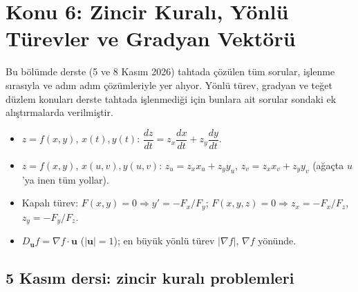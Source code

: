 \section{Konu 6: Zincir Kuralı, Yönlü Türevler ve Gradyan Vektörü}

Bu bölümde derste (5 ve 8 Kasım 2026) tahtada çözülen tüm sorular, işlenme sırasıyla ve adım adım çözümleriyle yer alıyor.
Yönlü türev, gradyan ve teğet düzlem konuları derste tahtada işlenmediği için bunlara ait sorular sondaki ek
alıştırmalarda verilmiştir.

\begin{bilgi}
\begin{itemize}
  \item $z=f(x,y)$, $x(t),y(t)$: $\dfrac{dz}{dt}=z_x\dfrac{dx}{dt}+z_y\dfrac{dy}{dt}$.
  \item $z=f(x,y)$, $x(u,v),y(u,v)$: $z_u=z_xx_u+z_yy_u$, $z_v=z_xx_v+z_yy_v$ (ağaçta $u$'ya inen tüm yollar).
  \item Kapalı türev: $F(x,y)=0\Rightarrow y'=-F_x/F_y$; $F(x,y,z)=0\Rightarrow z_x=-F_x/F_z$, $z_y=-F_y/F_z$.
  \item $D_{\mathbf u}f=\nabla f\cdot\mathbf u$ ($|\mathbf u|=1$); en büyük yönlü türev $|\nabla f|$, $\nabla f$ yönünde.
\end{itemize}
\end{bilgi}

\subsection{5 Kasım dersi: zincir kuralı problemleri}

